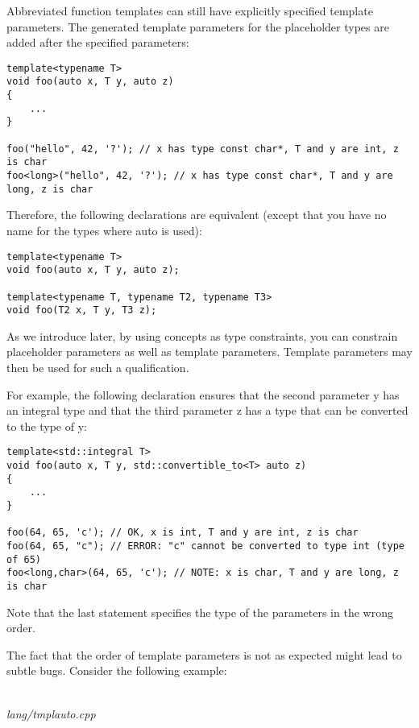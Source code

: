 Abbreviated function templates can still have explicitly specified template parameters. The generated template parameters for the placeholder types are added after the specified parameters:

\begin{lstlisting}[style=styleCXX]
template<typename T>
void foo(auto x, T y, auto z)
{
	...
}

foo("hello", 42, '?'); // x has type const char*, T and y are int, z is char
foo<long>("hello", 42, '?'); // x has type const char*, T and y are long, z is char
\end{lstlisting}

Therefore, the following declarations are equivalent (except that you have no name for the types where auto is used):

\begin{lstlisting}[style=styleCXX]
template<typename T>
void foo(auto x, T y, auto z);

template<typename T, typename T2, typename T3>
void foo(T2 x, T y, T3 z);
\end{lstlisting}

As we introduce later, by using concepts as type constraints, you can constrain placeholder parameters as well as template parameters. Template parameters may then be used for such a qualification.

For example, the following declaration ensures that the second parameter y has an integral type and that the third parameter z has a type that can be converted to the type of y:

\begin{lstlisting}[style=styleCXX]
template<std::integral T>
void foo(auto x, T y, std::convertible_to<T> auto z)
{
	...
}

foo(64, 65, 'c'); // OK, x is int, T and y are int, z is char
foo(64, 65, "c"); // ERROR: "c" cannot be converted to type int (type of 65)
foo<long,char>(64, 65, 'c'); // NOTE: x is char, T and y are long, z is char
\end{lstlisting}

Note that the last statement specifies the type of the parameters in the wrong order.

The fact that the order of template parameters is not as expected might lead to subtle bugs. Consider the following example:

\noindent
\hspace*{\fill} \\ %
\textit{lang/tmplauto.cpp}

